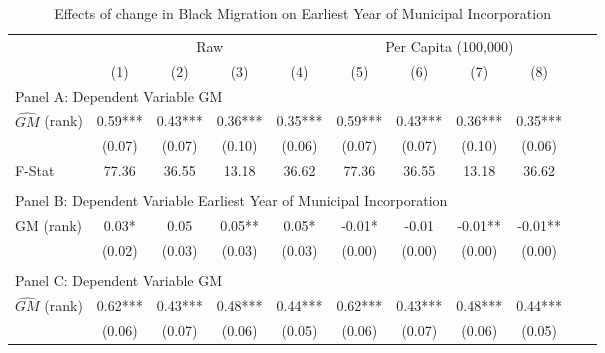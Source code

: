  \begin{table}[htbp]\centering {} \begin{threeparttable} \caption{Effects of change in Black Migration on Earliest Year of Municipal Incorporation} \begin{tabular}{l*{10}{c}} \toprule
                &\multicolumn{4}{c}{Raw}                                    &\multicolumn{4}{c}{Per Capita (100,000)}                   \\\cmidrule(lr){2-5}\cmidrule(lr){6-9}
                &\multicolumn{1}{c}{(1)}   &\multicolumn{1}{c}{(2)}   &\multicolumn{1}{c}{(3)}   &\multicolumn{1}{c}{(4)}   &\multicolumn{1}{c}{(5)}   &\multicolumn{1}{c}{(6)}   &\multicolumn{1}{c}{(7)}   &\multicolumn{1}{c}{(8)}   \\
\cmidrule(lr){1-9}
\multicolumn{8}{l}{Panel A: Dependent Variable GM}\\
\cmidrule(lr){1-9}
$\hat{GM}$ (rank)&       0.59***&       0.43***&       0.36***&       0.35***&       0.59***&       0.43***&       0.36***&       0.35***\\
                &     (0.07)   &     (0.07)   &     (0.10)   &     (0.06)   &     (0.07)   &     (0.07)   &     (0.10)   &     (0.06)   \\
\midrule
F-Stat          &      77.36   &      36.55   &      13.18   &      36.62   &      77.36   &      36.55   &      13.18   &      36.62   \\
\cmidrule[\heavyrulewidth](lr){1-9} \\ \cmidrule[\heavyrulewidth](lr){1-9}
\multicolumn{8}{l}{Panel B: Dependent Variable Earliest Year of Municipal Incorporation}\\
\cmidrule(lr){1-9}
GM  (rank)      &       0.03*  &       0.05   &       0.05** &       0.05*  &      -0.01*  &      -0.01   &      -0.01** &      -0.01** \\
                &     (0.02)   &     (0.03)   &     (0.03)   &     (0.03)   &     (0.00)   &     (0.00)   &     (0.00)   &     (0.00)   \\
\cmidrule[\heavyrulewidth](lr){1-9} \\ \cmidrule[\heavyrulewidth](lr){1-9}
\multicolumn{8}{l}{Panel C: Dependent Variable GM}\\
\cmidrule(lr){1-9}
$\hat{GM}$ (rank)&       0.62***&       0.43***&       0.48***&       0.44***&       0.62***&       0.43***&       0.48***&       0.44***\\
                &     (0.06)   &     (0.07)   &     (0.06)   &     (0.05)   &     (0.06)   &     (0.07)   &     (0.06)   &     (0.05)   \\

\end{tabular}
\end{threeparttable}
\end{table}
